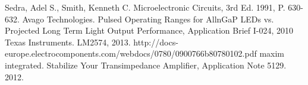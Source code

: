 \begin{thebibliography}{11}
		Sedra, Adel S., Smith, Kenneth C. Microelectronic Circuits, 3rd Ed. 1991, P. 630-632.
		Avago Technologies. Pulsed Operating Ranges for AllnGaP LEDs vs. Projected Long Term Light Output Performance, Application Brief I-024, 2010
		Texas Instruments. LM2574, 2013. http://docs-europe.electrocomponents.com/webdocs/0780/0900766b80780102.pdf
		maxim integrated. Stabilize Your Transimpedance Amplifier, Application Note 5129. 2012. 
\end{thebibliography}